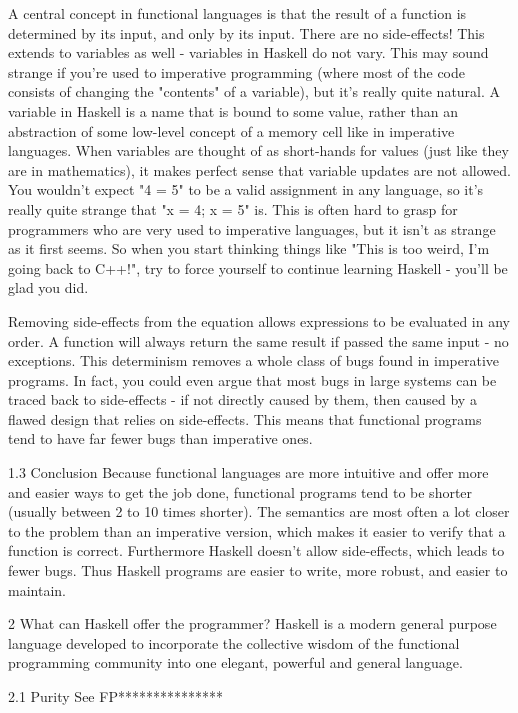 \documentclass{report}
\begin{document}
A central concept in functional languages is that the result of a function is determined by its input, and only by its input. There are no side-effects! This extends to variables as well - variables in Haskell do not vary. This may sound strange if you're used to imperative programming (where most of the code consists of changing the "contents" of a variable), but it's really quite natural. A variable in Haskell is a name that is bound to some value, rather than an abstraction of some low-level concept of a memory cell like in imperative languages. When variables are thought of as short-hands for values (just like they are in mathematics), it makes perfect sense that variable updates are not allowed. You wouldn't expect "4 = 5" to be a valid assignment in any language, so it's really quite strange that "x = 4; x = 5" is. This is often hard to grasp for programmers who are very used to imperative languages, but it isn't as strange as it first seems. So when you start thinking things like "This is too weird, I'm going back to C++!", try to force yourself to continue learning Haskell - you'll be glad you did.

Removing side-effects from the equation allows expressions to be evaluated in any order. A function will always return the same result if passed the same input - no exceptions. This determinism removes a whole class of bugs found in imperative programs. In fact, you could even argue that most bugs in large systems can be traced back to side-effects - if not directly caused by them, then caused by a flawed design that relies on side-effects. This means that functional programs tend to have far fewer bugs than imperative ones.

1.3 Conclusion
Because functional languages are more intuitive and offer more and easier ways to get the job done, functional programs tend to be shorter (usually between 2 to 10 times shorter). The semantics are most often a lot closer to the problem than an imperative version, which makes it easier to verify that a function is correct. Furthermore Haskell doesn't allow side-effects, which leads to fewer bugs. Thus Haskell programs are easier to write, more robust, and easier to maintain.

2 What can Haskell offer the programmer?
Haskell is a modern general purpose language developed to incorporate the collective wisdom of the functional programming community into one elegant, powerful and general language.

2.1 Purity
See FP***************
\end{document}
